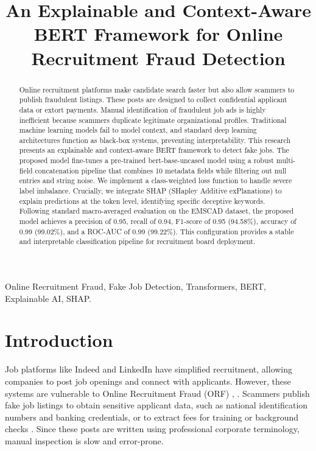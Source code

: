 \documentclass[conference]{IEEEtran}
\begin{document}
\title{An Explainable and Context-Aware BERT Framework for Online Recruitment Fraud Detection}

\author{
}

\maketitle

\begin{abstract}
Online recruitment platforms make candidate search faster but also allow scammers to publish fraudulent listings. These posts are designed to collect confidential applicant data or extort payments. Manual identification of fraudulent job ads is highly inefficient because scammers duplicate legitimate organizational profiles. Traditional machine learning models fail to model context, and standard deep learning architectures function as black-box systems, preventing interpretability. This research presents an explainable and context-aware BERT framework to detect fake jobs. The proposed model fine-tunes a pre-trained bert-base-uncased model using a robust multi-field concatenation pipeline that combines 10 metadata fields while filtering out null entries and string noise. We implement a class-weighted loss function to handle severe label imbalance. Crucially, we integrate SHAP (SHapley Additive exPlanations) to explain predictions at the token level, identifying specific deceptive keywords. Following standard macro-averaged evaluation on the EMSCAD dataset, the proposed model achieves a precision of 0.95, recall of 0.94, F1-score of 0.95 (94.58\%), accuracy of 0.99 (99.02\%), and a ROC-AUC of 0.99 (99.22\%). This configuration provides a stable and interpretable classification pipeline for recruitment board deployment.
\end{abstract}

\begin{IEEEkeywords}
Online Recruitment Fraud, Fake Job Detection, Transformers, BERT, Explainable AI, SHAP.
\end{IEEEkeywords}

\section{Introduction}
Job platforms like Indeed and LinkedIn have simplified recruitment, allowing companies to post job openings and connect with applicants. However, these systems are vulnerable to Online Recruitment Fraud (ORF) \cite{taneja2025fraud}, \cite{pillai2023detecting}. Scammers publish fake job listings to obtain sensitive applicant data, such as national identification numbers and banking credentials, or to extract fees for training or background checks \cite{naude2023machine}. Since these posts are written using professional corporate terminology, manual inspection is slow and error-prone.
\end{document}
